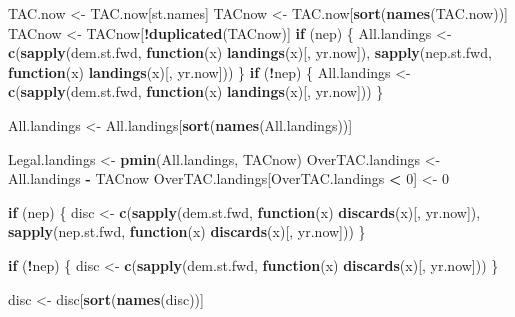 \documentclass[
]{article}
\newenvironment{Shaded}{\begin{snugshade}}{\end{snugshade}}
\newcommand{\ControlFlowTok}[1]{\textcolor[rgb]{0.13,0.29,0.53}{\textbf{#1}}}
\newcommand{\DecValTok}[1]{\textcolor[rgb]{0.00,0.00,0.81}{#1}}
\newcommand{\KeywordTok}[1]{\textcolor[rgb]{0.13,0.29,0.53}{\textbf{#1}}}
\newcommand{\NormalTok}[1]{#1}
\newcommand{\OperatorTok}[1]{\textcolor[rgb]{0.81,0.36,0.00}{\textbf{#1}}}
\newcommand{\StringTok}[1]{\textcolor[rgb]{0.31,0.60,0.02}{#1}}
\begin{document}
\begin{Shaded}
\begin{Highlighting}[]
\NormalTok{TAC.now <-}\StringTok{ }\NormalTok{TAC.now[st.names]}
\NormalTok{TACnow <-}\StringTok{ }\NormalTok{TAC.now[}\KeywordTok{sort}\NormalTok{(}\KeywordTok{names}\NormalTok{(TAC.now))]}
\NormalTok{TACnow <-}\StringTok{ }\NormalTok{TACnow[}\OperatorTok{!}\KeywordTok{duplicated}\NormalTok{(TACnow)]}
\ControlFlowTok{if}\NormalTok{ (nep) \{}
\NormalTok{    All.landings <-}\StringTok{ }\KeywordTok{c}\NormalTok{(}\KeywordTok{sapply}\NormalTok{(dem.st.fwd, }\ControlFlowTok{function}\NormalTok{(x) }\KeywordTok{landings}\NormalTok{(x)[, yr.now]), }\KeywordTok{sapply}\NormalTok{(nep.st.fwd, }
        \ControlFlowTok{function}\NormalTok{(x) }\KeywordTok{landings}\NormalTok{(x)[, yr.now]))}
\NormalTok{\}}
\ControlFlowTok{if}\NormalTok{ (}\OperatorTok{!}\NormalTok{nep) \{}
\NormalTok{    All.landings <-}\StringTok{ }\KeywordTok{c}\NormalTok{(}\KeywordTok{sapply}\NormalTok{(dem.st.fwd, }\ControlFlowTok{function}\NormalTok{(x) }\KeywordTok{landings}\NormalTok{(x)[, yr.now]))}
\NormalTok{\}}

\NormalTok{All.landings <-}\StringTok{ }\NormalTok{All.landings[}\KeywordTok{sort}\NormalTok{(}\KeywordTok{names}\NormalTok{(All.landings))]}

\NormalTok{Legal.landings <-}\StringTok{ }\KeywordTok{pmin}\NormalTok{(All.landings, TACnow)}
\NormalTok{OverTAC.landings <-}\StringTok{ }\NormalTok{All.landings }\OperatorTok{-}\StringTok{ }\NormalTok{TACnow}
\NormalTok{OverTAC.landings[OverTAC.landings }\OperatorTok{<}\StringTok{ }\DecValTok{0}\NormalTok{] <-}\StringTok{ }\DecValTok{0}

\ControlFlowTok{if}\NormalTok{ (nep) \{}
\NormalTok{    disc <-}\StringTok{ }\KeywordTok{c}\NormalTok{(}\KeywordTok{sapply}\NormalTok{(dem.st.fwd, }\ControlFlowTok{function}\NormalTok{(x) }\KeywordTok{discards}\NormalTok{(x)[, yr.now]), }\KeywordTok{sapply}\NormalTok{(nep.st.fwd, }
        \ControlFlowTok{function}\NormalTok{(x) }\KeywordTok{discards}\NormalTok{(x)[, yr.now]))}
\NormalTok{\}}

\ControlFlowTok{if}\NormalTok{ (}\OperatorTok{!}\NormalTok{nep) \{}
\NormalTok{    disc <-}\StringTok{ }\KeywordTok{c}\NormalTok{(}\KeywordTok{sapply}\NormalTok{(dem.st.fwd, }\ControlFlowTok{function}\NormalTok{(x) }\KeywordTok{discards}\NormalTok{(x)[, yr.now]))}
\NormalTok{\}}

\NormalTok{disc <-}\StringTok{ }\NormalTok{disc[}\KeywordTok{sort}\NormalTok{(}\KeywordTok{names}\NormalTok{(disc))]}


\end{Highlighting}
\end{Shaded}
\end{document}

